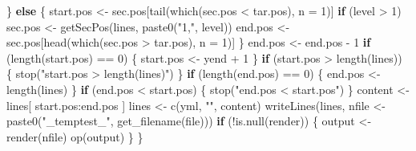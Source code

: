 \documentclass[
]{article}
\newenvironment{Shaded}{\begin{snugshade}}{\end{snugshade}}
\newcommand{\AttributeTok}[1]{\textcolor[rgb]{0.77,0.63,0.00}{#1}}
\newcommand{\ControlFlowTok}[1]{\textcolor[rgb]{0.13,0.29,0.53}{\textbf{#1}}}
\newcommand{\DecValTok}[1]{\textcolor[rgb]{0.00,0.00,0.81}{#1}}
\newcommand{\FunctionTok}[1]{\textcolor[rgb]{0.00,0.00,0.00}{#1}}
\newcommand{\NormalTok}[1]{#1}
\newcommand{\OtherTok}[1]{\textcolor[rgb]{0.56,0.35,0.01}{#1}}
\newcommand{\SpecialCharTok}[1]{\textcolor[rgb]{0.00,0.00,0.00}{#1}}
\newcommand{\StringTok}[1]{\textcolor[rgb]{0.31,0.60,0.02}{#1}}
\begin{document}
\begin{Shaded}
\begin{Highlighting}[]
\NormalTok{  \} }\ControlFlowTok{else}\NormalTok{ \{}
\NormalTok{    start.pos }\OtherTok{\textless{}{-}}\NormalTok{ sec.pos[}\FunctionTok{tail}\NormalTok{(}\FunctionTok{which}\NormalTok{(sec.pos }\SpecialCharTok{\textless{}}\NormalTok{ tar.pos), }\AttributeTok{n =} \DecValTok{1}\NormalTok{)]}
    \ControlFlowTok{if}\NormalTok{ (level }\SpecialCharTok{\textgreater{}} \DecValTok{1}\NormalTok{) sec.pos }\OtherTok{\textless{}{-}} \FunctionTok{getSecPos}\NormalTok{(lines, }\FunctionTok{paste0}\NormalTok{(}\StringTok{"1,"}\NormalTok{, level))}
\NormalTok{    end.pos }\OtherTok{\textless{}{-}}\NormalTok{ sec.pos[}\FunctionTok{head}\NormalTok{(}\FunctionTok{which}\NormalTok{(sec.pos }\SpecialCharTok{\textgreater{}}\NormalTok{ tar.pos), }\AttributeTok{n =} \DecValTok{1}\NormalTok{)]}
\NormalTok{  \}}
\NormalTok{  end.pos }\OtherTok{\textless{}{-}}\NormalTok{ end.pos }\SpecialCharTok{{-}} \DecValTok{1}
  \ControlFlowTok{if}\NormalTok{ (}\FunctionTok{length}\NormalTok{(start.pos) }\SpecialCharTok{==} \DecValTok{0}\NormalTok{) \{}
\NormalTok{    start.pos }\OtherTok{\textless{}{-}}\NormalTok{ yend }\SpecialCharTok{+} \DecValTok{1}
\NormalTok{  \}}
  \ControlFlowTok{if}\NormalTok{ (start.pos }\SpecialCharTok{\textgreater{}} \FunctionTok{length}\NormalTok{(lines)) \{}
    \FunctionTok{stop}\NormalTok{(}\StringTok{"start.pos \textgreater{} length(lines)"}\NormalTok{)}
\NormalTok{  \}}
  \ControlFlowTok{if}\NormalTok{ (}\FunctionTok{length}\NormalTok{(end.pos) }\SpecialCharTok{==} \DecValTok{0}\NormalTok{) \{}
\NormalTok{    end.pos }\OtherTok{\textless{}{-}} \FunctionTok{length}\NormalTok{(lines)}
\NormalTok{  \}}
  \ControlFlowTok{if}\NormalTok{ (end.pos }\SpecialCharTok{\textless{}}\NormalTok{ start.pos) \{}
    \FunctionTok{stop}\NormalTok{(}\StringTok{"end.pos \textless{} start.pos"}\NormalTok{)}
\NormalTok{  \}}
\NormalTok{  content }\OtherTok{\textless{}{-}}\NormalTok{ lines[ start.pos}\SpecialCharTok{:}\NormalTok{end.pos ]}
\NormalTok{  lines }\OtherTok{\textless{}{-}} \FunctionTok{c}\NormalTok{(yml, }\StringTok{""}\NormalTok{, content)}
  \FunctionTok{writeLines}\NormalTok{(lines, nfile }\OtherTok{\textless{}{-}} \FunctionTok{paste0}\NormalTok{(}\StringTok{"\_temptest\_"}\NormalTok{, }\FunctionTok{get\_filename}\NormalTok{(file)))}
  \ControlFlowTok{if}\NormalTok{ (}\SpecialCharTok{!}\FunctionTok{is.null}\NormalTok{(render)) \{}
\NormalTok{    output }\OtherTok{\textless{}{-}} \FunctionTok{render}\NormalTok{(nfile)}
    \FunctionTok{op}\NormalTok{(output)}
\NormalTok{  \}}
\NormalTok{\}}


\end{Highlighting}
\end{Shaded}
\end{document}
